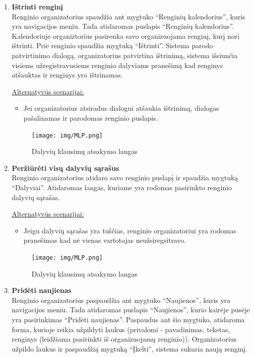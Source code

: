 \documentclass{VUMIFPSkursinis}
\begin{document}
\begin{enumerate} [label = \textbf{U\arabic*.}]
			\item \textbf{Ištrinti renginį}   \\
					Renginio organizatorius spaudžia ant mygtuko “Renginių kalendorius”, kuris yra navigacijos meniu. Tada atidaromas puslapis “Renginių kalendorius”. Kalendoriuje organiztorius pasirenka savo organizuojama renginį, kurį nori ištrinti. Prie renginio spaudžia mygtuką “Ištrinti”. Sistema parodo patvirtinimo dialogą, organizatorius patvirtina ištrinimą, sistema išsiunčia visiems užregistravusiems renginio dalyviams pranešimą kad renginys atšauktas ir renginys yra ištrinamas.
					
					\underline{Alternatyvūs scenarijai:}
					\begin{itemize}
						\item Jei organizatorius atsiradus dialogui atšaukia ištrinimą, dialogas pašalinamas ir parodomas renginio puslapis.
					\end{itemize}
				
				\begin{figure}[H]
					\centering
					\texttt{[image: img/MLP.png]}
					\caption{Dalyvių klausimų atsakymo langas}
					\label{fig:atsakyti-klausimus}
				\end{figure}	
				
			\item \textbf{Peržiūrėti visų dalyvių sąrašus}   \\
					Renginio organizatorius atidaro savo renginio puslapį ir spaudžia mygtuką “Dalyviai”. Atidaromas langas, kuriame yra rodomas pasirinkto renginio dalyvių sąrašas.
					
					\underline{Alternatyvūs scenarijai:}
					\begin{itemize}
						\item Jeigu dalyvių sąrašas yra tuščias, renginio organizatoriui yra rodomas pranešimas kad nė vienas vartotojas neužsiregsitravo.
					\end{itemize}
				
				\begin{figure}[H]
					\centering
					\texttt{[image: img/MLP.png]}
					\caption{Dalyvių klausimų atsakymo langas}
					\label{fig:atsakyti-klausimus}
				\end{figure}	
				
			\item \textbf{Pridėti naujienas}   \\
					Renginio organizatorius paspaudžia ant mygtuko “Naujienos”, kuris yra navigacijos meniu. Tada atidaromas puslapis “Naujienos”, kurio kairėje pusėje yra pasirinkimas “Pridėti naujienas”. Paspaudus ant šio mygtuko, atidaroma forma, kurioje reikia užpildyti laukus (privalomi - pavadinimas, tekstas, renginys (leidžiama pasirinkti iš organizuojamų renginio)). Organizatorius užpildo laukus ir paspaudžią mygtuką “Įkelti”, sistema sukuria naują renginį.
					

\end{enumerate}
\end{document}

